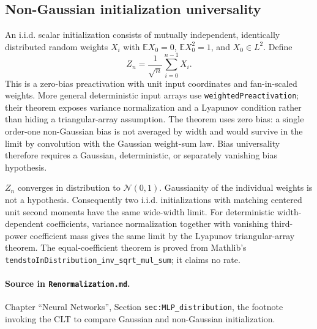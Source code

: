 \subsection{Non-Gaussian initialization universality}

\begin{definition}
\label{def:renorm:iidInitialization}
An i.i.d. scalar initialization consists of mutually independent, identically distributed random
weights $X_i$ with $\mathbb E X_0=0$, $\mathbb E X_0^2=1$, and $X_0\in L^2$.  Define
\[
 Z_n=\frac1{\sqrt n}\sum_{i=0}^{n-1}X_i.
\]
This is a zero-bias preactivation with unit input coordinates and fan-in-scaled weights.  More
general deterministic input arrays use \texttt{weightedPreactivation}; their theorem exposes
variance normalization and a Lyapunov condition rather than hiding a triangular-array assumption.
The theorem uses zero bias: a single order-one non-Gaussian bias is not averaged by width and would
survive in the limit by convolution with the Gaussian weight-sum law.  Bias universality therefore
requires a Gaussian, deterministic, or separately vanishing bias hypothesis.
\end{definition}

\begin{theorem}
\label{thm:renorm:initUniversality}
$Z_n$ converges in distribution to $\mathcal N(0,1)$.  Gaussianity of the individual weights is not
a hypothesis.  Consequently two i.i.d. initializations with matching centered unit second moments
have the same wide-width limit.  For deterministic width-dependent coefficients, variance
normalization together with vanishing third-power coefficient mass gives the same limit by the
Lyapunov triangular-array theorem.  The equal-coefficient theorem is proved from Mathlib's
\texttt{tendstoInDistribution\_inv\_sqrt\_mul\_sum}; it claims no rate.

\paragraph{Source in \texttt{Renormalization.md}.}
Chapter ``Neural Networks'', Section \texttt{sec:MLP\_distribution}, the footnote invoking the CLT
to compare Gaussian and non-Gaussian initialization.
\end{theorem}

